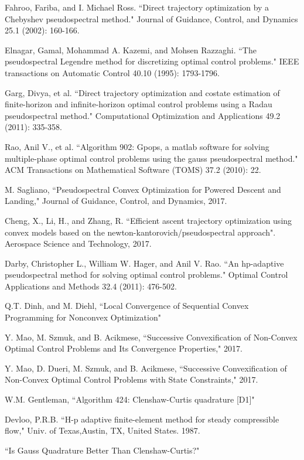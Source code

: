 \documentclass[10pt,a4paper]{article}
\begin{document}
\begin{thebibliography}{1}
		Fahroo, Fariba, and I. Michael Ross. ``Direct trajectory optimization by a Chebyshev pseudospectral method." Journal of Guidance, Control, and Dynamics 25.1 (2002): 160-166.
		
		Elnagar, Gamal, Mohammad A. Kazemi, and Mohsen Razzaghi. ``The pseudospectral Legendre method for discretizing optimal control problems." IEEE transactions on Automatic Control 40.10 (1995): 1793-1796.
		
		Garg, Divya, et al. ``Direct trajectory optimization and costate estimation of finite-horizon and infinite-horizon optimal control problems using a Radau pseudospectral method." Computational Optimization and Applications 49.2 (2011): 335-358.
		
		Rao, Anil V., et al. ``Algorithm 902: Gpops, a matlab software for solving multiple-phase optimal control problems using the gauss pseudospectral method." ACM Transactions on Mathematical Software (TOMS) 37.2 (2010): 22.				
				
		M. Sagliano, ``Pseudospectral Convex Optimization for Powered Descent and Landing," Journal of Guidance, Control, and Dynamics, 2017.
		
		Cheng, X., Li, H., and Zhang, R. ``Efficient ascent trajectory optimization using convex models based on the newton-kantorovich/pseudospectral approach". Aerospace Science and Technology, 2017.
		
		Darby, Christopher L., William W. Hager, and Anil V. Rao. ``An hp-adaptive pseudospectral method for solving optimal control problems." Optimal Control Applications and Methods 32.4 (2011): 476-502.
		
		Q.T. Dinh, and M. Diehl, ``Local Convergence of Sequential Convex Programming for Nonconvex Optimization"
		
		Y. Mao, M. Szmuk, and B. Acikmese, ``Successive Convexification of Non-Convex Optimal Control Problems and Its Convergence Properties," 2017.
		
		Y. Mao, D. Dueri, M. Szmuk, and B. Acikmese, ``Successive Convexification of Non-Convex Optimal Control Problems with State Constraints," 2017.
		
		W.M. Gentleman, ``Algorithm 424: Clenshaw-Curtis quadrature [D1]"
		
		Devloo, P.R.B. ``H-p adaptive finite-element method for steady compressible flow," Univ. of Texas,Austin, TX, United States. 1987.
		
		``Is Gauss Quadrature Better Than Clenshaw-Curtis?"
		
	\end{thebibliography}
\end{document}
